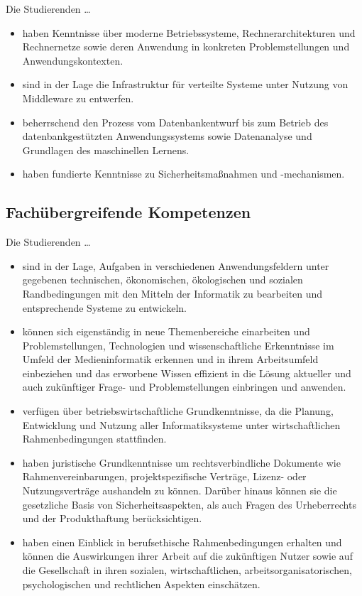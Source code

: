 Die Studierenden \ldots{}

\begin{itemize}
\tightlist
\item
  haben Kenntnisse über moderne Betriebssysteme, Rechnerarchitekturen
  und Rechnernetze sowie deren Anwendung in konkreten Problemstellungen
  und Anwendungskontexten.
\item
  sind in der Lage die Infrastruktur für verteilte Systeme unter Nutzung
  von Middleware zu entwerfen.
\item
  beherrschend den Prozess vom Datenbankentwurf bis zum Betrieb des
  datenbankgestützten Anwendungssystems sowie Datenanalyse und
  Grundlagen des maschinellen Lernens.
\item
  haben fundierte Kenntnisse zu Sicherheitsmaßnahmen und -mechanismen.
\end{itemize}

\subsection{Fachübergreifende
Kompetenzen\label{/mi-2017/selbstbericht/0200-qualifikationsziele/0000-qualifikationsziele}}\label{fachuxfcbergreifende-kompetenzenpathlabelmi-2017selbstbericht0200-qualifikationsziele0000-qualifikationsziele}

Die Studierenden \ldots{}

\begin{itemize}
\tightlist
\item
  sind in der Lage, Aufgaben in verschiedenen Anwendungsfeldern unter
  gegebenen technischen, ökonomischen, ökologischen und sozialen
  Randbedingungen mit den Mitteln der Informatik zu bearbeiten und
  entsprechende Systeme zu entwickeln.
\item
  können sich eigenständig in neue Themenbereiche einarbeiten und
  Problemstellungen, Technologien und wissenschaftliche Erkenntnisse im
  Umfeld der Medieninformatik erkennen und in ihrem Arbeitsumfeld
  einbeziehen und das erworbene Wissen effizient in die Lösung aktueller
  und auch zukünftiger Frage- und Problemstellungen einbringen und
  anwenden.
\item
  verfügen über betriebswirtschaftliche Grundkenntnisse, da die Planung,
  Entwicklung und Nutzung aller Informatiksysteme unter wirtschaftlichen
  Rahmenbedingungen stattfinden.
\item
  haben juristische Grundkenntnisse um rechtsverbindliche Dokumente wie
  Rahmenvereinbarungen, projektspezifische Verträge, Lizenz- oder
  Nutzungsverträge aushandeln zu können. Darüber hinaus können sie die
  gesetzliche Basis von Sicherheitsaspekten, als auch Fragen des
  Urheberrechts und der Produkthaftung berücksichtigen.
\item
  haben einen Einblick in berufsethische Rahmenbedingungen erhalten und
  können die Auswirkungen ihrer Arbeit auf die zukünftigen Nutzer sowie
  auf die Gesellschaft in ihren sozialen, wirtschaftlichen,
  arbeitsorganisatorischen, psychologischen und rechtlichen Aspekten
  einschätzen.
\end{itemize}

